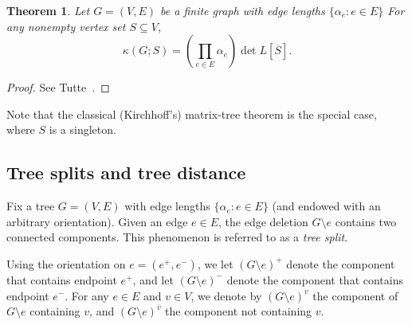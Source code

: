 \documentclass[12pt]{amsart}
\newtheorem{thm}{Theorem}[section]
\theoremstyle{definition}
\newcommand{\La}{L}
\newcommand{\trees}{\mathcal{F}_1}
\begin{document}
\begin{thm}
\label{thm:matrix-tree}
Let $G = (V,E)$ be a finite graph with edge lengths $\{ \alpha_e \colon e \in E\}$
%
For any nonempty vertex set $S \subseteq V$,
\begin{equation}
	\kappa( G ; S) = \left(\prod_{e \in E} \alpha_e \right) \det L[\overline S] .
\end{equation}
\end{thm}
\begin{proof}
See Tutte~\cite[Section VI.6, Equation (VI.6.7)]{tutte}.
\end{proof}
Note that the classical (Kirchhoff's) matrix-tree theorem is the special case, where $S$ is a singleton.

\subsection{Tree splits and tree distance}
\label{sec:tree-splits}


Fix a tree $G = (V,E)$ with edge lengths $\{ \alpha_e \colon e \in E\}$ (and endowed with an arbitrary orientation). Given an edge $e \in E$, the edge deletion $G \setminus e$ contains two connected components. This phenomenon is referred to as a {\em tree split}.

Using the orientation on $e = (e^+,e^-)$,
we let $(G \setminus e)^+$ denote the component that contains endpoint $e^+$, and let $(G\setminus e)^-$ denote the component that contains endpoint $e^-$.
For any $e \in E$ and $v \in V$, we denote by $(G \setminus e)^{v}$ the component of $G\setminus e$ containing $v$, and $(G\setminus e)^{\overline v}$ the component not containing $v$.
\end{document}
